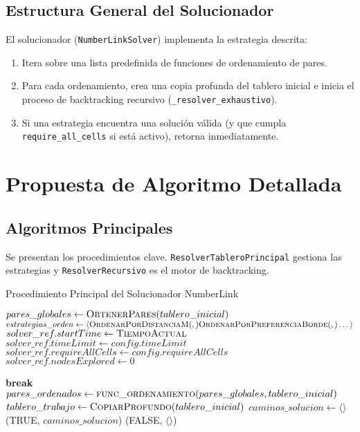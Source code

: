 \documentclass[spanish]{article}
\numberwithin{equation}{section}
\numberwithin{figure}{section}
\theoremstyle{definition}
\begin{document}
\subsection{Estructura General del Solucionador}
El solucionador (\texttt{NumberLinkSolver}) implementa la estrategia descrita:
\begin{enumerate}
    \item Itera sobre una lista predefinida de funciones de ordenamiento de pares.
    \item Para cada ordenamiento, crea una copia profunda del tablero inicial e inicia el proceso de backtracking recursivo (\texttt{\_resolver\_exhaustivo}).
    \item Si una estrategia encuentra una solución válida (y que cumpla \texttt{require\_all\_cells} si está activo), retorna inmediatamente.
\end{enumerate}

\section{Propuesta de Algoritmo Detallada}

\subsection{Algoritmos Principales}
Se presentan los procedimientos clave. \texttt{ResolverTableroPrincipal} gestiona las estrategias y \texttt{ResolverRecursivo} es el motor de backtracking.

\begin{algorithm}[H] %
\caption{Procedimiento Principal del Solucionador NumberLink}
\label{alg:principal}
\begin{algorithmic}[1]
    \State $pares\_globales \gets \Call{ObtenerPares}{tablero\_inicial}$
    \State $estrategias\_orden \gets \langle \Call{OrdenarPorDistanciaM}, \Call{OrdenarPorPreferenciaBorde}, \dots \rangle$ 
    \State $solver\_ref.startTime \gets \Call{TiempoActual}{}$
    \State $solver\_ref.timeLimit \gets config.timeLimit$
    \State $solver\_ref.requireAllCells \gets config.requireAllCells$
    \State $solver\_ref.nodesExplored \gets 0$

            \State \textbf{break}
        \EndIf
        \State $pares\_ordenados \gets \Call{func\_ordenamiento}{pares\_globales, tablero\_inicial}$
        \State $tablero\_trabajo \gets \Call{CopiarProfundo}{tablero\_inicial}$
        \State $caminos\_solucion \gets \langle \rangle$ 
            \State \Return (TRUE, $caminos\_solucion$)
        \EndIf
    \EndFor
    \State \Return (FALSE, $\langle \rangle$)
\EndProcedure
\end{algorithmic}
\end{algorithm}
\end{document}
